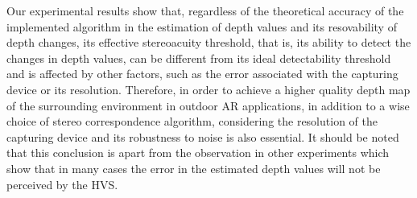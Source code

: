 \begin{itemize}
Our experimental results show that, regardless of the theoretical accuracy of the implemented algorithm in the estimation of depth values and its resovability of depth changes,
its effective stereoacuity threshold, that is, its ability to detect the changes in depth values, can be different from its ideal detectability threshold and is affected by other factors, 
such as the error associated with the capturing device or its resolution. Therefore, in order to achieve a higher quality depth map of the surrounding environment in outdoor AR applications, 
in addition to a wise choice of stereo correspondence algorithm, considering the resolution of the capturing device and its robustness to noise
is also essential. It should be noted that this conclusion is apart from the observation in other experiments which show that in many cases
the error in the estimated depth values will not be perceived by the HVS.
\end{itemize}

